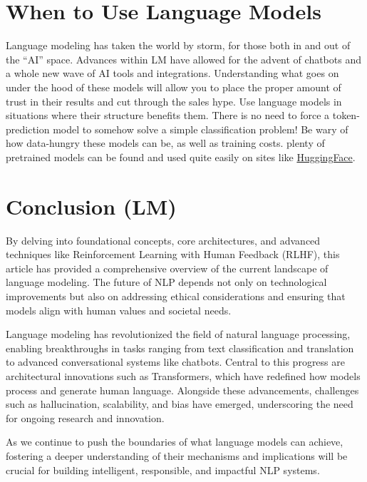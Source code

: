 \section{When to Use Language Models}
    \large Language modeling has taken the world by storm, for those both in and out of the ``AI'' space. Advances within LM have allowed for the advent of chatbots and a whole new wave of AI tools and integrations. Understanding what goes on under the hood of these models will allow you to place the proper amount of trust in their results and cut through the sales hype. Use language models in situations where their structure benefits them. There is no need to force a token-prediction model to somehow solve a simple classification problem! Be wary of how data-hungry these models can be, as well as training costs. plenty of pretrained models can be found and used quite easily on sites like \href{https://huggingface.co/models}{HuggingFace}.


\section{Conclusion (LM)}
    \large By delving into foundational concepts, core architectures, and advanced techniques like Reinforcement Learning with Human Feedback (RLHF), this article has provided a comprehensive overview of the current landscape of language modeling. The future of NLP depends not only on technological improvements but also on addressing ethical considerations and ensuring that models align with human values and societal needs. 

    Language modeling has revolutionized the field of natural language processing, enabling breakthroughs in tasks ranging from text classification and translation to advanced conversational systems like chatbots. Central to this progress are architectural innovations such as Transformers, which have redefined how models process and generate human language. Alongside these advancements, challenges such as hallucination, scalability, and bias have emerged, underscoring the need for ongoing research and innovation. 

    As we continue to push the boundaries of what language models can achieve, fostering a deeper understanding of their mechanisms and implications will be crucial for building intelligent, responsible, and impactful NLP systems.
